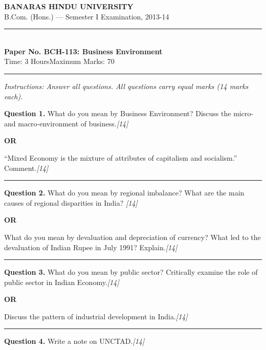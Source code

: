 \documentclass[11pt,a4paper]{article}
\newcommand{\pts}[1]{\hfill   \textit{[#1]}}
\begin{document}
\begin{center}
  {\large\bfseries BANARAS HINDU UNIVERSITY}\\[2pt]
  {\normalsize B.Com. (Hons.) --- Semester I Examination, 2013-14}\\[6pt]
  \rule{0.8\linewidth}{0.5pt}\\[6pt]
  {\large\bfseries Paper No. BCH-113: Business Environment}\\[4pt]
  {\normalsize Time: 3 Hours\hfill Maximum Marks: 70}
\end{center}

\rule{\linewidth}{0.4pt}

\smallskip



\noindent   \textit{Instructions: Answer all questions. All questions carry equal marks (14 marks each).}

\bigskip




\noindent   \textbf{Question 1.}
What do you mean by Business Environment? Discuss the micro- and macro-environment of business.\pts{14}

\centerline{   \textbf{OR}}

``Mixed Economy is the mixture of attributes of capitalism and socialism.'' Comment.\pts{14}

\medskip\rule{\linewidth}{0.2pt}




\noindent   \textbf{Question 2.}
What do you mean by regional imbalance? What are the main causes of regional disparities in India? \pts{14}

\centerline{   \textbf{OR}}

What do you mean by devaluation and depreciation of currency? What led to the devaluation of Indian Rupee in July 1991? Explain.\pts{14}

\medskip\rule{\linewidth}{0.2pt}




\noindent   \textbf{Question 3.}
What do you mean by public sector? Critically examine the role of public sector in Indian Economy.\pts{14}

\centerline{   \textbf{OR}}

Discuss the pattern of industrial development in India.\pts{14}

\medskip\rule{\linewidth}{0.2pt}




\noindent   \textbf{Question 4.}
Write a note on UNCTAD.\pts{14}
\end{document}
